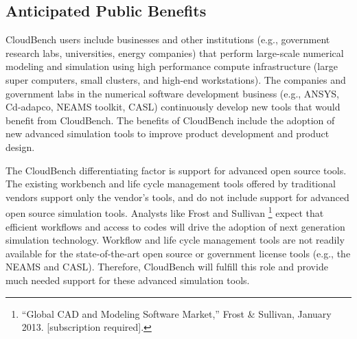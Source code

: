 \subsection{Anticipated Public Benefits}
CloudBench users include businesses and other institutions (e.g.,
government research labs, universities, energy companies) that perform
large-scale numerical modeling and simulation using high performance
compute infrastructure (large super computers, small clusters, and
high-end workstations). The companies and government labs in the
numerical software development business (e.g., ANSYS, Cd-adapco, NEAMS
toolkit, CASL) continuously develop new tools that would benefit from
CloudBench.
The benefits of CloudBench include the adoption of
new advanced simulation tools to improve product development and
product design.


The CloudBench differentiating factor is support for advanced open
source tools. The existing workbench and life cycle management tools
offered by traditional vendors support only the vendor's tools, and do
not include support for advanced open source simulation tools. Analysts
like Frost and Sullivan \footnote{``Global CAD and Modeling Software Market,'' Frost \& Sullivan, January 2013. [subscription required].} expect that efficient workflows
and access to codes will drive the adoption of next generation
simulation technology. Workflow and life cycle management tools are
not readily available for the state-of-the-art open source or
government license tools (e.g., the NEAMS and CASL). Therefore,
CloudBench will fulfill this role and provide much needed support for
these advanced simulation tools.

